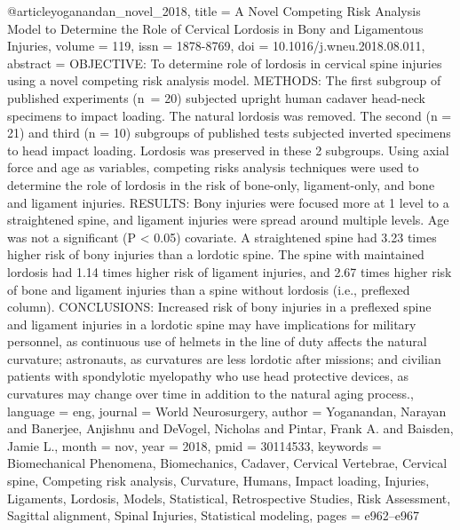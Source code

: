 @article{yoganandan_novel_2018,
	title = {A {Novel} {Competing} {Risk} {Analysis} {Model} to {Determine} the {Role} of {Cervical} {Lordosis} in {Bony} and {Ligamentous} {Injuries}},
	volume = {119},
	issn = {1878-8769},
	doi = {10.1016/j.wneu.2018.08.011},
	abstract = {OBJECTIVE: To determine role of lordosis in cervical spine injuries using a novel competing risk analysis model.
METHODS: The first subgroup of published experiments (n = 20) subjected upright human cadaver head-neck specimens to impact loading. The natural lordosis was removed. The second (n = 21) and third (n = 10) subgroups of published tests subjected inverted specimens to head impact loading. Lordosis was preserved in these 2 subgroups. Using axial force and age as variables, competing risks analysis techniques were used to determine the role of lordosis in the risk of bone-only, ligament-only, and bone and ligament injuries.
RESULTS: Bony injuries were focused more at 1 level to a straightened spine, and ligament injuries were spread around multiple levels. Age was not a significant (P {\textless} 0.05) covariate. A straightened spine had 3.23 times higher risk of bony injuries than a lordotic spine. The spine with maintained lordosis had 1.14 times higher risk of ligament injuries, and 2.67 times higher risk of bone and ligament injuries than a spine without lordosis (i.e., preflexed column).
CONCLUSIONS: Increased risk of bony injuries in a preflexed spine and ligament injuries in a lordotic spine may have implications for military personnel, as continuous use of helmets in the line of duty affects the natural curvature; astronauts, as curvatures are less lordotic after missions; and civilian patients with spondylotic myelopathy who use head protective devices, as curvatures may change over time in addition to the natural aging process.},
	language = {eng},
	journal = {World Neurosurgery},
	author = {Yoganandan, Narayan and Banerjee, Anjishnu and DeVogel, Nicholas and Pintar, Frank A. and Baisden, Jamie L.},
	month = nov,
	year = {2018},
	pmid = {30114533},
	keywords = {Biomechanical Phenomena, Biomechanics, Cadaver, Cervical Vertebrae, Cervical spine, Competing risk analysis, Curvature, Humans, Impact loading, Injuries, Ligaments, Lordosis, Models, Statistical, Retrospective Studies, Risk Assessment, Sagittal alignment, Spinal Injuries, Statistical modeling},
	pages = {e962--e967}
}

